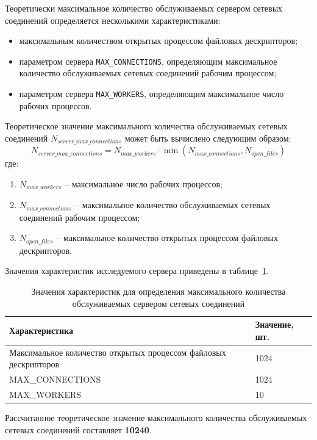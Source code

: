 Теоретически максимальное количество обслуживаемых сервером сетевых соединений определяется несколькими характеристиками:
\begin{itemize}
	\item максимальным количеством открытых процессом файловых дескрипторов;
	\item параметром сервера \texttt{MAX\_CONNECTIONS}, определяющим максимальное количество обслуживаемых сетевых соединений рабочим процессом;
	\item параметром сервера \texttt{MAX\_WORKERS}, определяющим максимальное число рабочих процессов.
\end{itemize}

Теоретическое значение максимального количества обслуживаемых сетевых соединений $N_{server\_max\_connections}$ может быть вычислено следующим образом:
\begin{equation}
	N_{server\_max\_connections} = N_{max\_workers}\cdot \min(N_{max\_connections}, N_{open\_files})
\end{equation}
где:
\begin{enumerate}
	\item $N_{max\_workers}$ -- максимальное число рабочих процессов;
	\item $N_{max\_connections}$ -- максимальное количество обслуживаемых сетевых соединений рабочим процессом;
	\item $N_{open\_files}$ -- максимальное количество открытых процессом файловых дескрипторов.
\end{enumerate}

Значения характеристик исследуемого сервера приведены в таблице~\ref{tbl:server-values}.

\begin{table}[H]
	\centering
	\caption{Значения характеристик для определения максимального количества обслуживаемых сервером сетевых соединений}
	\label{tbl:server-values}
	\begin{tabularx}{\textwidth}{|X|X|}
		\hline
		\textbf{Характеристика} & \textbf{Значение, шт.} \\
		\hline
		Максимальное количество открытых процессом файловых дескрипторов & 1024 \\
		\hline
		MAX\_CONNECTIONS & 1024 \\
		\hline 
		MAX\_WORKERS & 10 \\
		\hline 
	\end{tabularx}
\end{table}

Рассчитанное теоретическое значение максимального количества обслуживаемых сетевых соединений составляет \textbf{10240}.

